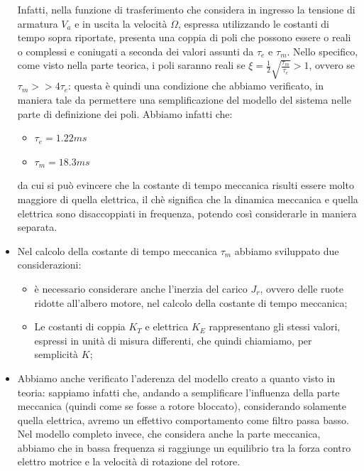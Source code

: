 \begin{itemize}
	Infatti, nella funzione di trasferimento che considera in ingresso la tensione di armatura $V_a$ e in uscita la velocità $\Omega$, espressa utilizzando le costanti di tempo sopra riportate, presenta una coppia di poli che possono essere o reali o complessi e coniugati a seconda dei valori assunti da $\tau_e$ e $\tau_m$.
	Nello specifico, come visto nella parte teorica, i poli saranno reali se $\xi = \frac{1}{2}\sqrt{\frac{\tau_m}{\tau_e}}>1$, ovvero se $\tau_m >> 4\tau_e$: questa è quindi una condizione che abbiamo verificato, in maniera tale da permettere una semplificazione del modello del sistema nelle parte di definizione dei poli.
	Abbiamo infatti che:
	\begin{itemize}
		\item $\tau_e = 1.22 ms$
		\item $\tau_m = 18.3 ms$
	\end{itemize}
	da cui si può evincere che la costante di tempo meccanica risulti essere molto maggiore di quella elettrica, il chè significa che la dinamica meccanica e quella elettrica sono disaccoppiati in frequenza, potendo così considerarle in maniera separata.
	\item Nel calcolo della costante di tempo meccanica $\tau_m$ abbiamo sviluppato due considerazioni:
	\begin{itemize}
		\item è necessario considerare anche l'inerzia del carico $J_r$, ovvero delle ruote ridotte all'albero motore, nel calcolo della costante di tempo meccanica;
		\item Le costanti di coppia $K_T$ e elettrica $K_E$ rappresentano gli stessi valori, espressi in unità di misura differenti, che quindi chiamiamo, per semplicità $K$;
	\end{itemize}
	\item Abbiamo anche verificato l'aderenza del modello creato a quanto visto in teoria: sappiamo infatti che, andando a semplificare l'influenza della parte meccanica (quindi come se fosse a rotore bloccato), considerando solamente quella elettrica, avremo un effettivo comportamento come filtro passa basso. Nel modello completo invece, che considera anche la parte meccanica, abbiamo che in bassa frequenza si raggiunge un equilibrio tra la forza contro elettro motrice e la velocità di rotazione del rotore.
	

\end{itemize}
